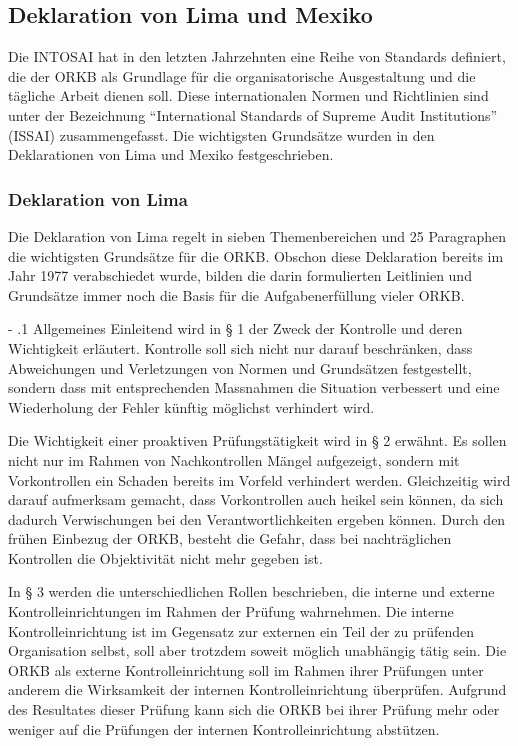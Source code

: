 \documentclass[10pt]{article}
\makeatletter
\renewcommand\paragraph{\@startsection{paragraph}{3}{0mm}{-\baselineskip}{.1\baselineskip}{\normalfont\normalsize\bfseries}}
\renewcommand\paragraph{%
\@startsection{paragraph}{3}{0mm}%
{-\baselineskip}%
{.1\baselineskip}%
{\normalfont\normalsize\bfseries}}
\makeatother
\begin{document}
\subsection{Deklaration von Lima und Mexiko}\label{subsec:deklaration_von_lima_und_mexiko}
Die INTOSAI hat in den letzten Jahrzehnten eine Reihe von Standards definiert, die der ORKB als Grundlage für die organisatorische Ausgestaltung und die tägliche Arbeit dienen soll. Diese internationalen Normen und Richtlinien sind unter der Bezeichnung “{}International Standards of Supreme Audit Institutions”{} (ISSAI) zusammengefasst. Die wichtigsten Grundsätze wurden in den Deklarationen von Lima und Mexiko festgeschrieben.

\subsubsection{Deklaration von Lima}\label{subsubsec:deklaration_von_lima}
Die Deklaration von Lima regelt in sieben Themenbereichen und 25 Paragraphen die wichtigsten Grundsätze für die ORKB. Obschon diese Deklaration bereits im Jahr 1977 verabschiedet wurde, bilden die darin formulierten Leitlinien und Grundsätze immer noch die Basis für die Aufgabenerfüllung vieler ORKB.

\paragraph{Allgemeines}\label{para:allgemeines}
Einleitend wird in § 1 der Zweck der Kontrolle und deren Wichtigkeit erläutert. Kontrolle soll sich nicht nur darauf beschränken, dass Abweichungen und Verletzungen von Normen und Grundsätzen festgestellt, sondern dass mit entsprechenden Massnahmen die Situation verbessert und eine Wiederholung der Fehler künftig möglichst verhindert wird.

Die Wichtigkeit einer proaktiven Prüfungstätigkeit wird in § 2 erwähnt. Es sollen nicht nur im Rahmen von Nachkontrollen Mängel aufgezeigt, sondern mit Vorkontrollen ein Schaden bereits im Vorfeld verhindert werden. Gleichzeitig wird darauf aufmerksam gemacht, dass Vorkontrollen auch heikel sein können, da sich dadurch Verwischungen bei den Verantwortlichkeiten ergeben können. Durch den frühen Einbezug der ORKB, besteht die Gefahr, dass bei nachträglichen Kontrollen die Objektivität nicht mehr gegeben ist.

In § 3 werden die unterschiedlichen Rollen beschrieben, die interne und externe Kontrolleinrichtungen im Rahmen der Prüfung wahrnehmen. Die interne Kontroll­einrichtung ist im Gegensatz zur externen ein Teil der zu prüfenden Organisation selbst, soll aber trotzdem soweit möglich unabhängig tätig sein. Die ORKB als externe Kontrolleinrichtung soll im Rahmen ihrer Prüfungen unter anderem die Wirksamkeit der internen Kontrolleinrichtung überprüfen. Aufgrund des Resultates dieser Prüfung kann sich die ORKB bei ihrer Prüfung mehr oder weniger auf die Prüfungen der internen Kontrolleinrichtung abstützen.
\end{document}
